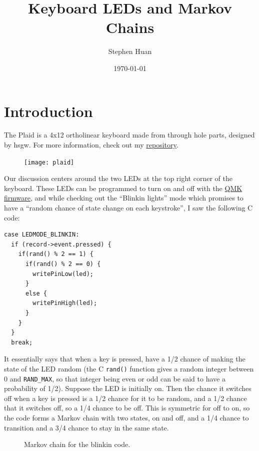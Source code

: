 \documentclass[11pt, oneside]{article}
\title{Keyboard LEDs and Markov Chains}
\author{Stephen Huan}
\date{\today}
\begin{document}
\maketitle
\section{Introduction}

The Plaid is a 4x12 ortholinear keyboard made from through
hole parts, designed by hsgw. For more information, check out
my \href{https://github.com/stephen-huan/plaid}{repository}.

\begin{figure}[h!]
  \centering
  \texttt{[image: plaid]}
\end{figure}

Our discussion centers around the two LEDs at the top right corner of the keyboard.
These LEDs can be programmed to turn on and off with the 
\href{https://github.com/qmk/qmk_firmware/blob/master/keyboards/dm9records/plaid/keymaps/default/keymap.c}{QMK firmware},
and while checking out the \enquote{Blinkin lights} mode
which promises to have a \enquote{random chance of state
change on each keystroke}, I saw the following C code:
\begin{verbatim}
case LEDMODE_BLINKIN:
  if (record->event.pressed) {
    if(rand() % 2 == 1) {
      if(rand() % 2 == 0) {
        writePinLow(led);
      }
      else {
        writePinHigh(led);
      }
    }
  }
  break;
\end{verbatim}

It essentially says that when a key is pressed, have a 1/2 chance of making the
state of the LED random (the C \texttt{rand()} function gives a random integer
between 0 and \texttt{RAND\_MAX}, so that integer being even or odd can be said
to have a probability of 1/2). Suppose the LED is initially on. Then the chance
it switches off when a key is pressed is a 1/2 chance for it to be random, and
a 1/2 chance that it switches off, so a 1/4 chance to be off. This is symmetric
for off to on, so the code forms a Markov chain with two states, on and off,
and a 1/4 chance to transition and a 3/4 chance to stay in the same state.

\begin{figure}[h!]
  \centering
  \caption{Markov chain for the blinkin code.}
\end{figure}
\end{document}
